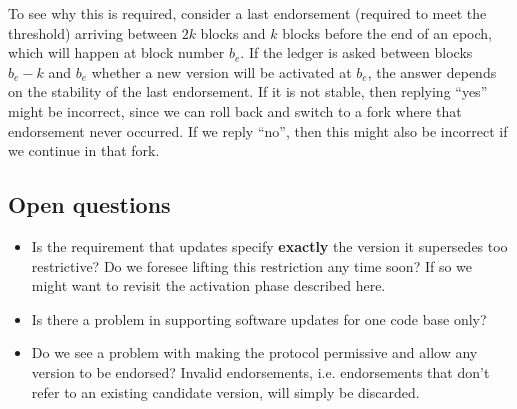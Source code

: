 To see why this is required, consider a last endorsement (required to meet the
threshold) arriving between $2k$ blocks and $k$ blocks before the end of an
epoch, which will happen at block number $b_e$. If the ledger is asked between
blocks $b_e - k$ and $b_e$ whether a new version will be activated at $b_e$, the
answer depends on the stability of the last endorsement. If it is not stable,
then replying ``yes'' might be incorrect, since we can roll back and switch to a
fork where that endorsement never occurred. If we reply ``no'', then this might
also be incorrect if we continue in that fork.

\subsection{Open questions}
\label{sec:open-questions}

\begin{itemize}
	\item Is the requirement that updates specify \textbf{exactly} the version 
	it
	supersedes too restrictive? Do we foresee lifting this restriction any time
	soon? If so we might want to revisit the activation phase described here.
	\item Is there a problem in supporting software updates for one code base 
	only?
	\item Do we see a problem with making the protocol permissive and allow any
	version to be endorsed? Invalid endorsements, i.e. endorsements that don't
	refer to an existing candidate version, will simply be discarded.
\end{itemize}


